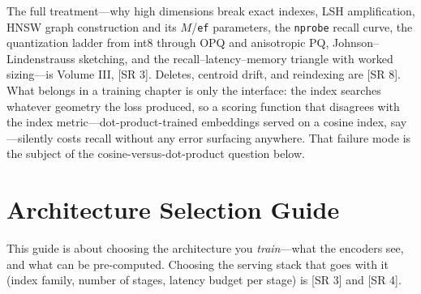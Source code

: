 The full treatment---why high dimensions break exact indexes, LSH amplification, HNSW graph construction and its $M$/\texttt{ef} parameters, the \texttt{nprobe} recall curve, the quantization ladder from int8 through OPQ and anisotropic PQ, Johnson--Lindenstrauss sketching, and the recall--latency--memory triangle with worked sizing---is Volume III, [SR 3]. Deletes, centroid drift, and reindexing are [SR 8]. What belongs in a training chapter is only the interface: the index searches whatever geometry the loss produced, so a scoring function that disagrees with the index metric---dot-product-trained embeddings served on a cosine index, say---silently costs recall without any error surfacing anywhere. That failure mode is the subject of the cosine-versus-dot-product question below.

\section{Architecture Selection Guide}
\label{sec:similarity_arch_selection}

This guide is about choosing the architecture you \textit{train}---what the encoders see, and what can be pre-computed. Choosing the serving stack that goes with it (index family, number of stages, latency budget per stage) is [SR 3] and [SR 4].

